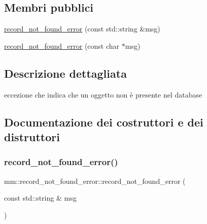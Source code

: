 \subsection*{Membri pubblici}
\begin{DoxyCompactItemize}
\item 
\hyperlink{classmm_1_1record__not__found__error_a3457a336328538174f06d4023b7474c8}{record\+\_\+not\+\_\+found\+\_\+error} (const std\+::string \&msg)
\item 
\hyperlink{classmm_1_1record__not__found__error_aa8bc0fb2788b4442295f85103fa94e2b}{record\+\_\+not\+\_\+found\+\_\+error} (const char $\ast$msg)
\end{DoxyCompactItemize}


\subsection{Descrizione dettagliata}
eccezione che indica che un oggetto non è presente nel database 

\subsection{Documentazione dei costruttori e dei distruttori}
\mbox{\label{classmm_1_1record__not__found__error_a3457a336328538174f06d4023b7474c8}} 
\subsubsection{\texorpdfstring{record\+\_\+not\+\_\+found\+\_\+error()}{record\_not\_found\_error()}\hspace{0.1cm}{\footnotesize\ttfamily [1/2]}}
{\footnotesize\ttfamily mm\+::record\+\_\+not\+\_\+found\+\_\+error\+::record\+\_\+not\+\_\+found\+\_\+error (\begin{DoxyParamCaption}\item[{const std\+::string \&}]{msg }\end{DoxyParamCaption})\hspace{0.3cm}{\ttfamily [explicit]}}

\mbox{\label{classmm_1_1record__not__found__error_aa8bc0fb2788b4442295f85103fa94e2b}} 
